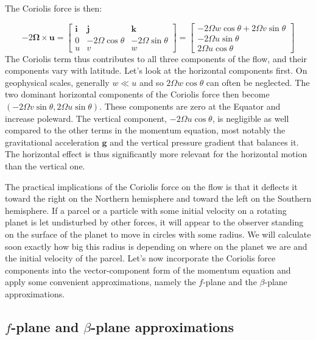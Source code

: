 \documentclass[12pt]{article}
\numberwithin{equation}{section}
\numberwithin{figure}{section}
\numberwithin{table}{section}
\begin{document}
The Coriolis force is then:

\begin{equation}
  - 2 \mathbf{\Omega} \times \mathbf{u} =
  \begin{bmatrix}
    \mathbf{i} & \mathbf{j} & \mathbf{k} \\
    0 & - 2 \Omega \cos\theta & - 2 \Omega \sin\theta \\
    u & v & w
  \end{bmatrix} =
  \begin{bmatrix}
    - 2 \Omega w \cos\theta + 2 \Omega v \sin\theta \\
    - 2 \Omega u \sin\theta \\
    2 \Omega u \cos\theta
  \end{bmatrix}
\end{equation}
The Coriolis term thus contributes to all three components of the flow, and
their components vary with latitude.
Let's look at the horizontal components first.
On geophysical scales, generally $w \ll u$ and so $2 \Omega w \cos\theta$
can often be neglected.
The two dominant horizontal components of the Coriolis force then become
$(-2\Omega v \sin\theta, 2\Omega u \sin\theta)$.
These components are zero at the Equator and increase poleward.
The vertical component, $-2 \Omega u \cos\theta$, is negligible as well
compared to the other terms in the momentum equation, most notably the
gravitational acceleration $\mathbf{g}$ and the vertical pressure gradient that
balances it.
The horizontal effect is thus significantly more relevant for the horizontal
motion than the vertical one.

The practical implications of the Coriolis force on the flow is that it deflects
it toward the right on the Northern hemisphere and toward the left on the Southern
hemisphere.
If a parcel or a particle with some initial velocity on a rotating planet is
let undisturbed by other forces, it will appear to the observer standing on the
surface of the planet to move in circles with some radius.
We will calculate soon exactly how big this radius is depending on where on
the planet we are and the initial velocity of the parcel.
Let's now incorporate the Coriolis force components into the vector-component
form of the momentum equation and apply some convenient approximations, namely
the $f$-plane and the $\beta$-plane approximations.

\subsection{$f$-plane and $\beta$-plane approximations}
\end{document}
